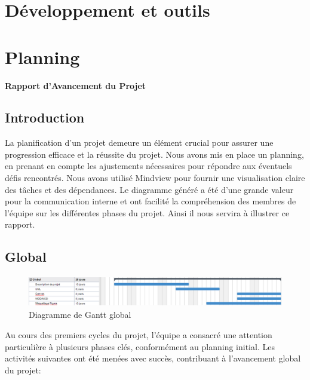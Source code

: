 \documentclass[mstat,12pt]{unswthesis}
\begin{document}
\begin{adjustwidth}{-2cm}{}
\hypertarget{duxe9veloppement-et-outils}{%
\chapter{Développement et outils}\label{duxe9veloppement-et-outils}}

\hypertarget{planning}{%
\chapter{Planning}\label{planning}}

\textbf{Rapport d'Avancement du Projet}

\hypertarget{introduction-1}{%
\section{Introduction}\label{introduction-1}}

La planification d'un projet demeure un élément crucial pour assurer une
progression efficace et la réussite du projet. Nous avons mis en place
un planning, en prenant en compte les ajustements nécessaires pour
répondre aux éventuels défis rencontrés. Nous avons utilisé Mindview
pour fournir une visualisation claire des tâches et des dépendances. Le
diagramme généré a été d'une grande valeur pour la communication interne
et ont facilité la compréhension des membres de l'équipe sur les
différentes phases du projet. Ainsi il nous servira à illustrer ce
rapport.

\hypertarget{global}{%
\section{Global}\label{global}}

\begin{figure}
\centering
\includegraphics[width=12cm,height=1.34cm]{images/global_gantt.png}
\caption{Diagramme de Gantt global}
\end{figure}

Au cours des premiers cycles du projet, l'équipe a consacré une
attention particulière à plusieurs phases clés, conformément au planning
initial. Les activités suivantes ont été menées avec succès, contribuant
à l'avancement global du projet:


\end{adjustwidth}
\end{document}
